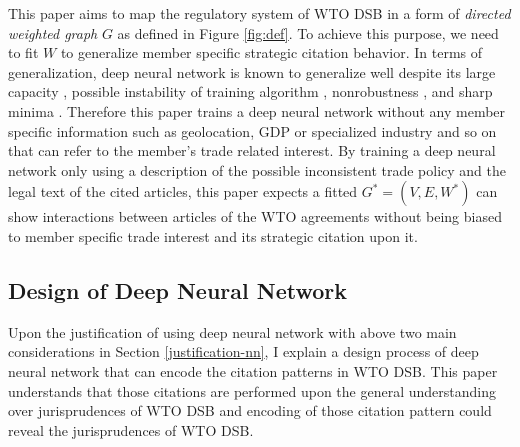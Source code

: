 \documentclass[12pt,letterpaper]{article}
\begin{document}
This paper aims to map the regulatory system of WTO DSB in a form of \textit{directed weighted graph} $G$ as defined in Figure \ref{fig:def}.
To achieve this purpose, we need to fit $W$ to generalize member specific strategic citation behavior.
In terms of generalization, deep neural network is known to generalize well despite
its large capacity \citep{neyshabur2017exploring}, possible instability of training algorithm \citep{charles2017stability}, nonrobustness \citep{zahavy2017ensemble}, and sharp minima \citep{dinh2017sharp}.
Therefore this paper trains a deep neural network without any member specific information such as geolocation, GDP or specialized industry and so on that can refer to the member's trade related interest. 
By training a deep neural network only using a description of the possible inconsistent trade policy and the legal text of the cited articles,
this paper expects a fitted $G^{*} = (V, E, W^*)$ can show interactions between articles of the WTO agreements
without being biased to member specific trade interest and its strategic citation upon it.

\subsection{Design of Deep Neural Network}\label{subsec:design:dnn}
Upon the justification of using deep neural network with above two main considerations in Section \ref{justification-nn}, %
I explain a design process of deep neural network that can encode the citation patterns in WTO DSB. 
This paper understands that those citations are performed upon the general understanding over jurisprudences of WTO DSB and encoding of 
those citation pattern could reveal the jurisprudences of WTO DSB.






\end{document}
